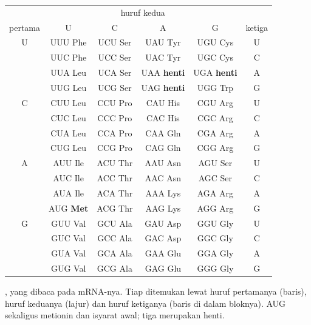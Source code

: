 \begin{omfigure}
\begin{tabular}{c|cccc|c}
\multicolumn{1}{c}{} & \multicolumn{4}{c}{\small huruf kedua} & \multicolumn{1}{c}{} \\
{\small pertama} & U & C & A & G & {\small ketiga} \\ \hline
U & UUU Phe & UCU Ser & UAU Tyr & UGU Cys & U \\
 & UUC Phe & UCC Ser & UAC Tyr & UGC Cys & C \\
 & UUA Leu & UCA Ser & UAA \textbf{henti} & UGA \textbf{henti} & A \\
 & UUG Leu & UCG Ser & UAG \textbf{henti} & UGG Trp & G \\ \hline
C & CUU Leu & CCU Pro & CAU His & CGU Arg & U \\
 & CUC Leu & CCC Pro & CAC His & CGC Arg & C \\
 & CUA Leu & CCA Pro & CAA Gln & CGA Arg & A \\
 & CUG Leu & CCG Pro & CAG Gln & CGG Arg & G \\ \hline
A & AUU Ile & ACU Thr & AAU Asn & AGU Ser & U \\
 & AUC Ile & ACC Thr & AAC Asn & AGC Ser & C \\
 & AUA Ile & ACA Thr & AAA Lys & AGA Arg & A \\
 & AUG \textbf{Met} & ACG Thr & AAG Lys & AGG Arg & G \\ \hline
G & GUU Val & GCU Ala & GAU Asp & GGU Gly & U \\
 & GUC Val & GCC Ala & GAC Asp & GGC Gly & C \\
 & GUA Val & GCA Ala & GAA Glu & GGA Gly & A \\
 & GUG Val & GCG Ala & GAG Glu & GGG Gly & G \\
\end{tabular}

{\small {}, yang dibaca pada mRNA-nya. Tiap  ditemukan
lewat huruf pertamanya (baris), huruf keduanya (lajur) dan huruf
ketiganya (baris di dalam bloknya). AUG sekaligus metionin dan isyarat
awal; tiga  merupakan henti.}
\end{omfigure}

